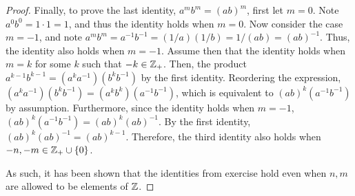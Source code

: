\documentclass[12pt]{article}
\begin{document}
\begin{proof}
		Finally, to prove the last identity, $a^mb^m = (ab)^m$, first let $m = 0$. Note 
		$a^0b^0 = 1 \cdot 1 = 1$, and thus the identity holds when $m = 0$. Now consider the 
		case $m = -1$, and note $a^mb^m = a^{-1}b^{-1} = (1/a)(1/b) = 1/(ab) = (ab)^{-1}$. Thus,
		the identity also holds when $m = -1$. Assume then that the identity holds when 
		$m = k$ for some $k$ such that $-k \in \mathbb{Z}_{+}$. Then, the product
		$a^{k - 1}b^{k - 1} = (a^k a^{-1})(b^kb^{-1})$ by the first identity. Reordering the expression,
		$(a^k a^{-1})(b^kb^{-1}) = (a^kb^k)(a^{-1}b^{-1})$, which is equivalent to 
		$(ab)^k (a^{-1}b^{-1})$ by assumption. Furthermore, since the identity holds when $m = -1$,
		$(ab)^k (a^{-1}b^{-1}) = (ab)^k(ab)^{-1}$. By the first identity, $(ab)^k(ab)^{-1} = (ab)^{k - 1}$.
		Therefore, the third identity also holds when $-n, -m \in \mathbb{Z}_{+}\cup\{0\}$.
		
		As such, it has been shown that the identities from exercise  hold even when $n, m$
		are allowed to be elements of $\mathbb{Z}$.
	\end{proof}
\end{document}

